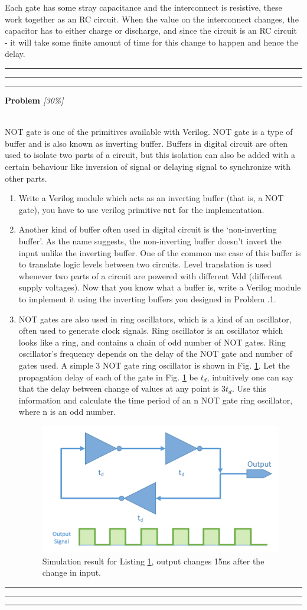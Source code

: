 \documentclass[a4paper,10pt]{article}
\theoremstyle{mytheor}
\newcounter{problemNumber}
\newcommand {
  \insertProblem}[2]{
  \vspace{0.5cm}
  \hrule \hrule \hrule
  \vspace{0.3cm}
  
  {
    \setlength{\parindent}{0}

    {
      \color{greatblue}
      \textbf{\Large{Problem \theproblemNumber}}
      \hfill
      \textit{[#1]}
    }

  }

  \vspace{6pt}\\#2

  \addtocounter{problemNumber}{1}

  \vspace{0.2cm}
  \hrule \hrule \hrule
  \vspace{0.5cm}
}
\newcounter{infoCount} %
\newcommand{\infocounter}[1]{%
  \refstepcounter{infoCount}%
  \theinfoCount%
  \label{#1}}%
\newcommand{\info}[3] {
  \begin{tcolorbox}[arc=1pt,colback=infocolor!5!white,colframe=infocolor!75!black,title=\textbf{Info \infocounter{#2} - #1}]  
    #3
  \end{tcolorbox}
  \addtocounter{infocnt}{1}
}
\newcommand{\inlinev}[1]{\lstinline[style=verilog-inline-style]{#1}}
\begin{document}
\info{Why do gates have delay?}{info:gates-delay}{ Each gate has some stray capacitance
  and the interconnect is resistive, these work together as an RC
  circuit. When the value on the interconnect changes, the capacitor
  has to either charge or discharge, and since the circuit is an RC
  circuit - it will take some finite amount of time for this change to
  happen and hence the delay.}

\insertProblem {30\%} { NOT gate is one of the primitives available with
  Verilog. NOT gate is a type of buffer and is also known as inverting
  buffer. Buffers in digital circuit are often used to isolate two
  parts of a circuit, but this isolation can also be added with a
  certain behaviour like inversion of signal or delaying signal to
  synchronize with other parts.
  
  \begin {enumerate}
  \item Write a Verilog module which acts as an inverting buffer (that
    is, a NOT gate), you have to use verilog primitive \inlinev{not}
    for the implementation.
  \item Another kind of buffer often used in digital circuit is the
    `non-inverting buffer'. As the name suggests, the non-inverting
    buffer doesn't invert the input unlike the inverting buffer. One
    of the common use case of this buffer is to translate logic levels
    between two circuits. Level translation is used whenever two parts
    of a circuit are powered with different Vdd (different supply
    voltages). Now that you know what a buffer is, write a Verilog
    module to implement it using the inverting buffers you designed in
    Problem {\theproblemNumber}.1.
  \item NOT gates are also used in ring oscillators, which is a kind
    of an oscillator, often used to generate clock signals. Ring
    oscillator is an oscillator which looks like a ring, and contains
    a chain of odd number of NOT gates. Ring oscillator's frequency
    depends on the delay of the NOT gate and number of gates used. A
    simple 3 NOT gate ring oscillator is shown in
    Fig. \ref{ring-oscillator}. Let the propagation delay of each of
    the gate in Fig. \ref{ring-oscillator} be $t_d$, intuitively one
    can say that the delay between change of values at any point is
    $3t_d$. Use this information and calculate the time period of an n
    NOT gate ring oscillator, where n is an odd number.

    \begin{figure}[!h] \centering  
      \includegraphics[width=0.5\linewidth]{./resources/ringOscillator.pdf}
      \caption{Simulation result for Listing \ref{ring-oscillator},
        output changes 15ns after the change in input.}
      \label{ring-oscillator}
    \end{figure}


\end{enumerate}}
\end{document}
